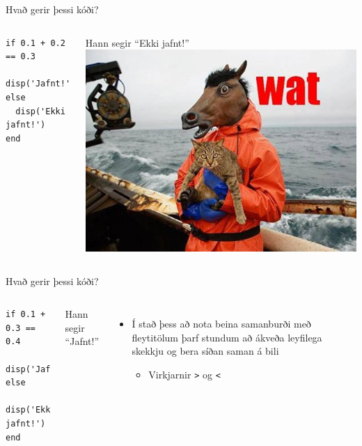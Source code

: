 \documentclass{beamer}
\begin{document}
\begin{frame}[fragile]{Hvað gerir þessi kóði?}
\begin{columns}
\begin{verbatim}
if 0.1 + 0.2 == 0.3
  disp('Jafnt!')
else
  disp('Ekki jafnt!')
end
\end{verbatim}
\pause
Hann segir ``Ekki jafnt!''
\pause
\includegraphics[width=\linewidth]{Pics/wat}
\end{columns}
\end{frame}

\begin{frame}[fragile]{Hvað gerir þessi kóði?}
\begin{columns}
\begin{verbatim}
if 0.1 + 0.3 == 0.4
  disp('Jafnt!')
else
  disp('Ekki jafnt!')
end
\end{verbatim}
\pause
Hann segir ``Jafnt!''
\begin{itemize}
 \item Í stað þess að nota beina samanburði með fleytitölum þarf stundum að ákveða leyfilega skekkju og bera síðan saman á bili
 \begin{itemize}
  \item Virkjarnir \texttt{>} og \texttt{<}
 \end{itemize}
\end{itemize}
\end{columns}
\end{frame}
\end{document}
